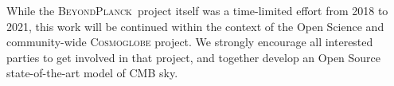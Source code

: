 \documentclass[twocolumn]{aa}
\newcommand{\BP}{\textsc{BeyondPlanck}}
\begin{document}
While the \BP\ project itself was a time-limited effort from 2018 to
2021, this work will be continued within the context of the Open
Science and community-wide \textsc{Cosmoglobe} project. We strongly
encourage all interested parties to get involved in that project, and
together develop an Open Source state-of-the-art model of CMB sky.

%








\end{document}
